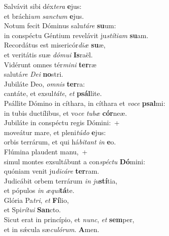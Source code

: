 \evenverse Salvávit sibi déx\textit{te}\textit{ra} \textbf{e}jus:~\*\\
\evenverse et bráchi\textit{um} \textit{san}\textit{ctum} \textbf{e}jus.\\
\oddverse Notum fecit Dóminus salu\textit{tá}\textit{re} \textbf{su}um:~\*\\
\oddverse in conspéctu Géntium revelávit ju\textit{stí}\textit{ti}\textit{am} \textbf{su}am.\\
\evenverse Recordátus est misericór\textit{di}\textit{æ} \textbf{su}æ,~\*\\
\evenverse et veritátis suæ \textit{dó}\textit{mu}\textit{i} \textbf{Is}raël.\\
\oddverse Vidérunt omnes tér\textit{mi}\textit{ni} \textbf{ter}ræ~\*\\
\oddverse salutá\textit{re} \textit{De}\textit{i} \textbf{no}stri.\\
\evenverse Jubiláte Deo, \textit{om}\textit{nis} \textbf{ter}ra:~\*\\
\evenverse cantáte, et exsul\textit{tá}\textit{te}, \textit{et} \textbf{psál}lite.\\
\oddverse Psállite Dómino in cíthara, in cíthara et \textit{vo}\textit{ce} \textbf{psal}mi:~\*\\
\oddverse in tubis ductílibus, et vo\textit{ce} \textit{tu}\textit{bæ} \textbf{cór}neæ.\\
\evenverse Jubiláte in conspéctu regis Dómini:~+\\
\evenverse  moveátur mare, et pleni\textit{tú}\textit{do} \textbf{e}jus:~\*\\
\evenverse orbis terrárum, et qui há\textit{bi}\textit{tant} \textit{in} \textbf{e}o.\\
\oddverse Flúmina plaudent manu,~+\\
\oddverse  simul montes exsultábunt a con\textit{spé}\textit{ctu} \textbf{Dó}mini:~\*\\
\oddverse quóniam venit ju\textit{di}\textit{cá}\textit{re} \textbf{ter}ram.\\
\evenverse Judicábit orbem terrárum \textit{in} \textit{ju}\textbf{stí}tia,~\*\\
\evenverse et pópulos \textit{in} \textit{æ}\textit{qui}\textbf{tá}te.\\
\oddverse Glória Pa\textit{tri}, \textit{et} \textbf{Fí}lio,~\*\\
\oddverse et Spi\textit{rí}\textit{tu}\textit{i} \textbf{San}cto.\\
\evenverse Sicut erat in princípio, et \textit{nunc}, \textit{et} \textbf{sem}per,~\*\\
\evenverse et in sǽcula sæ\textit{cu}\textit{ló}\textit{rum}. \textbf{A}men.\\
